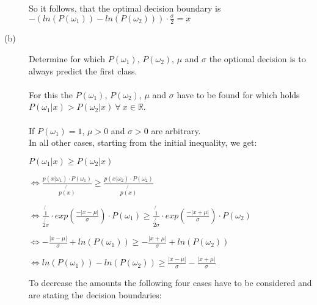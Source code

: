\documentclass{article}
\begin{document}
\begin{description}
So it follows, that the optimal decision boundary is $-(ln(P(\omega_1)) - ln (P(\omega_2))) \cdot \frac{\sigma}{2} =  x$

\item[(b)] 
Determine for which $P(\omega_1)$, $P(\omega_2)$, $\mu$ and $\sigma$ the optional decision is to always predict the first class.\\
\\
For this the $P(\omega_1)$, $P(\omega_2)$, $\mu$ and $\sigma$ have to be found for which holds $P(\omega_1|x) > P(\omega_2|x)\ \forall \ x \in \mathbb{R}$.\\
\\
If $P(\omega_1) = 1$, $\mu > 0$ and $\sigma > 0$  are arbitrary.\\
In all other cases, starting from the initial inequality, we get:

$P(\omega_1|x) \geq P (\omega_2|x)$

$\Leftrightarrow \frac{p(x|\omega_1)\cdot P(\omega_1)}{\not{p(x)}} \geq \frac{p(x|\omega_2) \cdot P(\omega_2)}{\not{p(x)}}$

$\Leftrightarrow \frac{\not{1}}{\not{2 \sigma}}\cdot exp(\frac{-|x-\mu|}{\sigma}) \cdot P(\omega_1) \geq \frac{\not{1}}{\not{2 \sigma}}\cdot exp(\frac{-|x+\mu|}{\sigma}) \cdot P(\omega_2)$

$\Leftrightarrow -\frac{|x-\mu|}{\sigma} + ln(P(\omega_1)) \geq -\frac{|x+\mu|}{\sigma} + ln (P(\omega_2))$

$\Leftrightarrow ln(P(\omega_1)) - ln (P(\omega_2)) \geq \frac{|x-\mu|}{\sigma} - \frac{|x+\mu|}{\sigma}$

\vspace{0.3cm}
To decrease the amounts the following four cases have to be considered and are stating the decision boundaries:


\end{description}
\end{document}
